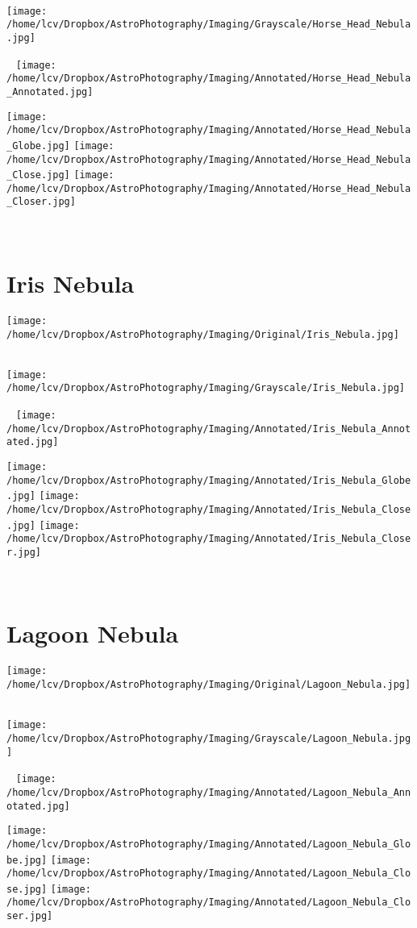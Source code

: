 {\footnotesize\color{white}


}\ \\
\texttt{[image: /home/lcv/Dropbox/AstroPhotography/Imaging/Grayscale/Horse\_Head\_Nebula.jpg]}
\begin{center}
 \ \newpage
\texttt{[image: /home/lcv/Dropbox/AstroPhotography/Imaging/Annotated/Horse\_Head\_Nebula\_Annotated.jpg]}

\texttt{[image: /home/lcv/Dropbox/AstroPhotography/Imaging/Annotated/Horse\_Head\_Nebula\_Globe.jpg]}
\texttt{[image: /home/lcv/Dropbox/AstroPhotography/Imaging/Annotated/Horse\_Head\_Nebula\_Close.jpg]}
\texttt{[image: /home/lcv/Dropbox/AstroPhotography/Imaging/Annotated/Horse\_Head\_Nebula\_Closer.jpg]}
\end{center}
\ \\\section{Iris Nebula}
\texttt{[image: /home/lcv/Dropbox/AstroPhotography/Imaging/Original/Iris\_Nebula.jpg]}
{\footnotesize\color{white}


}\ \\
\texttt{[image: /home/lcv/Dropbox/AstroPhotography/Imaging/Grayscale/Iris\_Nebula.jpg]}
\begin{center}
 \ \newpage
\texttt{[image: /home/lcv/Dropbox/AstroPhotography/Imaging/Annotated/Iris\_Nebula\_Annotated.jpg]}

\texttt{[image: /home/lcv/Dropbox/AstroPhotography/Imaging/Annotated/Iris\_Nebula\_Globe.jpg]}
\texttt{[image: /home/lcv/Dropbox/AstroPhotography/Imaging/Annotated/Iris\_Nebula\_Close.jpg]}
\texttt{[image: /home/lcv/Dropbox/AstroPhotography/Imaging/Annotated/Iris\_Nebula\_Closer.jpg]}
\end{center}
\ \\\section{Lagoon Nebula}
\texttt{[image: /home/lcv/Dropbox/AstroPhotography/Imaging/Original/Lagoon\_Nebula.jpg]}
{\footnotesize\color{white}


}\ \\
\texttt{[image: /home/lcv/Dropbox/AstroPhotography/Imaging/Grayscale/Lagoon\_Nebula.jpg]}
\begin{center}
 \ \newpage
\texttt{[image: /home/lcv/Dropbox/AstroPhotography/Imaging/Annotated/Lagoon\_Nebula\_Annotated.jpg]}

\texttt{[image: /home/lcv/Dropbox/AstroPhotography/Imaging/Annotated/Lagoon\_Nebula\_Globe.jpg]}
\texttt{[image: /home/lcv/Dropbox/AstroPhotography/Imaging/Annotated/Lagoon\_Nebula\_Close.jpg]}
\texttt{[image: /home/lcv/Dropbox/AstroPhotography/Imaging/Annotated/Lagoon\_Nebula\_Closer.jpg]}
\end{center}
